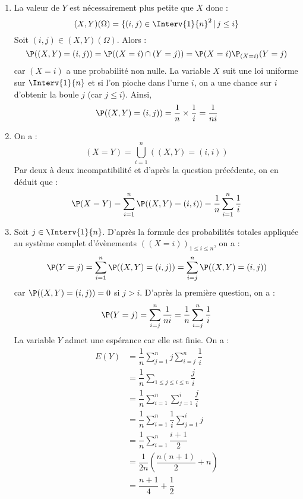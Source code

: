 \documentclass[a4paper,10pt]{report}
\begin{document}
\corr

\begin{enumerate}
\item La valeur de $Y$ est nécessairement plus petite que $X$ donc :
$$ (X,Y)(\Omega) = \lbrace (i,j) \in \Interv{1}{n}^2 \, \vert \, j \leq i \rbrace$$
Soit $(i,j) \in (X,Y)(\Omega)$. Alors :
$$ \P((X,Y)=(i,j)) = \P((X=i) \cap (Y=j)) = \P(X=i) \P_{(X=i)}(Y=j)$$
car $(X=i)$ a une probabilité non nulle. La variable $X$ suit une loi uniforme sur $\Interv{1}{n}$ et si l'on pioche dans l'urne $i$, on a une chance sur $i$ d'obtenir la boule $j$ (car $j \leq i$). Ainsi,
$$ \P((X,Y)=(i,j)) = \dfrac{1}{n} \times \dfrac{1}{i} = \dfrac{1}{ni}$$
\item On a :
$$ (X=Y) = \bigcup_{i=1}^n ((X,Y)=(i,i))$$
Par deux à deux incompatibilité et d'après la question précédente, on en déduit que :
$$ \P(X=Y) = \sum_{i=1}^n \P((X,Y)=(i,i)) = \dfrac{1}{n} \sum_{i=1}^n \dfrac{1}{i}$$
\item Soit $j \in \Interv{1}{n}$. D'après la formule des probabilités totales appliquée au système complet d'évènements $((X=i))_{1 \leq i \leq n}$, on a :
$$ \P(Y=j) = \sum_{i=1}^n \P((X,Y)=(i,j)) = \sum_{i=j}^n \P((X,Y)=(i,j))$$
car $\P((X,Y)=(i,j))=0$ si $j>i$. D'après la première question, on a :
$$ \P(Y=j) =\sum_{i=j}^n \dfrac{1}{ni} = \dfrac{1}{n} \sum_{i=j}^n \dfrac{1}{i}$$
La variable $Y$ admet une espérance car elle est finie. On a :
\begin{align*}
E(Y) & = \dfrac{1}{n} \sum_{j=1}^n j \sum_{i=j}^n \dfrac{1}{i} \\
& = \dfrac{1}{n} \sum_{1 \leq j \leq i \leq n} \dfrac{j}{i} \\ 
& = \dfrac{1}{n} \sum_{i=1}^n \sum_{j=1}^i \dfrac{j}{i} \\
& = \dfrac{1}{n} \sum_{i=1}^n  \dfrac{1}{i} \sum_{j=1}^i  j \\
& =  \dfrac{1}{n} \sum_{i=1}^n \dfrac{i+1}{2} \\
& = \dfrac{1}{2n} \left(  \dfrac{n(n+1)}{2} + n \right)\\
& = \dfrac{n+1}{4} + \dfrac{1}{2}
\end{align*}
\end{enumerate}
\end{document}
